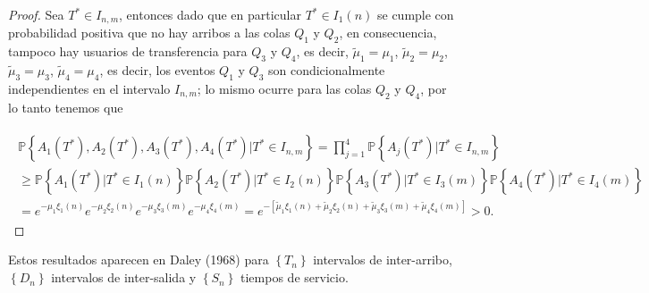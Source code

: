 \documentclass{article}
\newcommand{\prob}{\mathbb{P}}
\begin{document}
\begin{proof}
Sea $T^{*}\in I_{n,m}$, entonces dado que en particular $T^{*}\in I_{1}\left(n\right)$ se cumple con probabilidad positiva que no hay arribos a las colas $Q_{1}$ y $Q_{2}$, en consecuencia, tampoco hay usuarios de transferencia para $Q_{3}$ y $Q_{4}$, es decir, $\tilde{\mu}_{1}=\mu_{1}$, $\tilde{\mu}_{2}=\mu_{2}$, $\tilde{\mu}_{3}=\mu_{3}$, $\tilde{\mu}_{4}=\mu_{4}$, es decir, los eventos $Q_{1}$ y $Q_{3}$ son condicionalmente independientes en el intervalo $I_{n,m}$; lo mismo ocurre para las colas $Q_{2}$ y $Q_{4}$, por lo tanto tenemos que


\begin{eqnarray}
\begin{array}{l}
\prob\left\{A_{1}\left(T^{*}\right),A_{2}\left(T^{*}\right),
A_{3}\left(T^{*}\right),A_{4}\left(T^{*}\right)|T^{*}\in I_{n,m}\right\}
=\prod_{j=1}^{4}\prob\left\{A_{j}\left(T^{*}\right)|T^{*}\in I_{n,m}\right\}\\
\geq\prob\left\{A_{1}\left(T^{*}\right)|T^{*}\in I_{1}\left(n\right)\right\}
\prob\left\{A_{2}\left(T^{*}\right)|T^{*}\in I_{2}\left(n\right)\right\}
\prob\left\{A_{3}\left(T^{*}\right)|T^{*}\in I_{3}\left(m\right)\right\}
\prob\left\{A_{4}\left(T^{*}\right)|T^{*}\in I_{4}\left(m\right)\right\}\\
=e^{-\mu_{1}\xi_{1}\left(n\right)}
e^{-\mu_{2}\xi_{2}\left(n\right)}
e^{-\mu_{3}\xi_{3}\left(m\right)}
e^{-\mu_{4}\xi_{4}\left(m\right)}
=e^{-\left[\tilde{\mu}_{1}\xi_{1}\left(n\right)
+\tilde{\mu}_{2}\xi_{2}\left(n\right)
+\tilde{\mu}_{3}\xi_{3}\left(m\right)
+\tilde{\mu}_{4}\xi_{4}
\left(m\right)\right]}>0.
\end{array}
\end{eqnarray}
\end{proof}


Estos resultados aparecen en Daley (1968) \cite{Daley68} para $\left\{T_{n}\right\}$ intervalos de inter-arribo, $\left\{D_{n}\right\}$ intervalos de inter-salida y $\left\{S_{n}\right\}$ tiempos de servicio.
\end{document}
